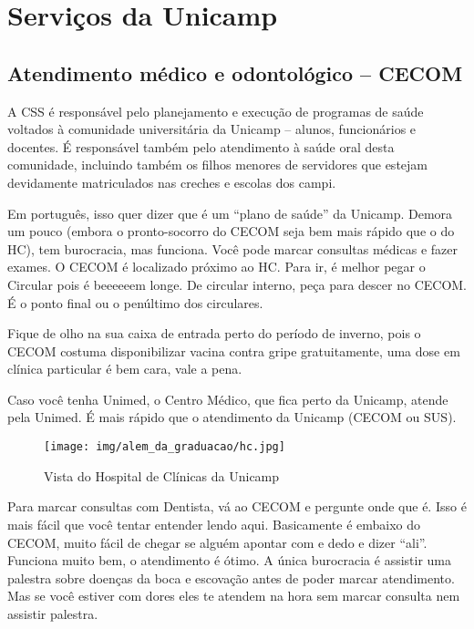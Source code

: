 
\section{Serviços da Unicamp}
\subsection{Atendimento médico e odontológico -- CECOM}

A CSS é responsável pelo planejamento e execução de programas de saúde voltados
à comunidade universitária da Unicamp -- alunos, funcionários e docentes.  É
responsável também pelo atendimento à saúde oral desta comunidade, incluindo
também os filhos menores de servidores que estejam devidamente matriculados nas
creches e escolas dos campi.

Em português, isso quer dizer que é um ``plano de saúde'' da Unicamp. Demora um
pouco (embora o pronto-socorro do CECOM seja bem mais rápido que o do HC), tem
burocracia, mas funciona. Você pode marcar consultas médicas e fazer exames.  O
CECOM é localizado próximo ao HC. Para ir, é melhor pegar o Circular pois é
beeeeeem longe. De circular interno, peça para descer no CECOM. É o ponto final
ou o penúltimo dos circulares.

Fique de olho na sua caixa de entrada perto do período de inverno, pois o CECOM
costuma disponibilizar vacina contra gripe gratuitamente, uma dose em clínica
particular é bem cara, vale a pena.

Caso você tenha Unimed, o Centro Médico, que fica perto da Unicamp, atende pela
Unimed. É mais rápido que o atendimento da Unicamp (CECOM ou SUS).

\begin{figure}[h!]
    \centering
    \texttt{[image: img/alem\_da\_graduacao/hc.jpg]}
    \caption{Vista do Hospital de Clínicas da Unicamp}
\end{figure}

Para marcar consultas com Dentista, vá ao CECOM e pergunte onde que é. Isso é
mais fácil que você tentar entender lendo aqui. Basicamente é embaixo do CECOM,
muito fácil de chegar se alguém apontar com e dedo e dizer ``ali''. Funciona
muito bem, o atendimento é ótimo. A única burocracia é assistir uma palestra
sobre doenças da boca e escovação antes de poder marcar atendimento. Mas se você
estiver com dores eles te atendem na hora sem marcar consulta nem assistir
palestra.

